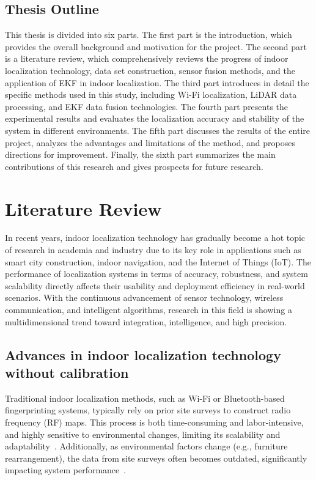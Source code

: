 \documentclass[12pt,a4paper]{article}
\numberwithin{equation}{section}
\begin{document}
\subsection{Thesis Outline}
This thesis is divided into six parts. The first part is the introduction, which
provides the overall background and motivation for the project. The second part
is a literature review, which comprehensively reviews the progress of indoor
localization technology, data set construction, sensor fusion methods, and the
application of EKF in indoor localization. The third part introduces in detail
the specific methods used in this study, including Wi-Fi localization, LiDAR
data processing, and EKF data fusion technologies. The fourth part presents the
experimental results and evaluates the localization accuracy and stability of
the system in different environments. The fifth part discusses the results of
the entire project, analyzes the advantages and limitations of the method, and
proposes directions for improvement. Finally, the sixth part summarizes the main
contributions of this research and gives prospects for future research.


\newpage
\section{Literature Review}
In recent years, indoor localization technology has gradually become a hot topic
of research in academia and industry due to its key role in applications such as
smart city construction, indoor navigation, and the Internet of Things
(IoT). The performance of localization
systems in terms of accuracy, robustness, and system scalability directly
affects their usability and deployment efficiency in real-world scenarios. With
the continuous advancement of sensor technology, wireless communication, and
intelligent algorithms, research in this field is showing a multidimensional
trend toward integration, intelligence, and high precision.

\subsection{Advances in indoor localization technology without calibration}
Traditional indoor localization methods, such as Wi-Fi or Bluetooth-based
fingerprinting systems, typically rely on prior site surveys to construct radio
frequency (RF) maps. This process is both time-consuming and labor-intensive,
and highly sensitive to environmental changes, limiting its scalability and
adaptability~\cite{liu2020survey}. Additionally, as environmental factors change
(e.g., furniture rearrangement), the data from site surveys often becomes
outdated, significantly impacting system performance~\cite{jiang2019indoor}.
\end{document}
